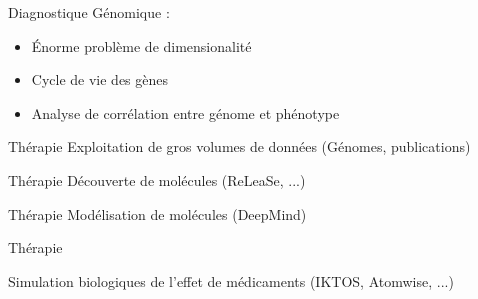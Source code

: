 \begin{frame}{Diagnostique}
  Génomique :
  \newline
  \begin{minipage}[c]{0.49\linewidth}
    \begin{itemize}
    \item Énorme problème de dimensionalité
    \item Cycle de vie des gènes
    \item Analyse de corrélation entre génome et phénotype
    \end{itemize}
  \end{minipage}\hfill
  \begin{minipage}[c]{0.49\linewidth}
  \end{minipage}\hfill
\end{frame}

\begin{frame}{Thérapie}
  Exploitation de gros volumes de données (Génomes, publications)
  \newline
  \newline
  \begin{minipage}[c]{0.49\linewidth}
  \end{minipage}\hfill
  \begin{minipage}[c]{0.49\linewidth}
  \end{minipage}\hfill
\end{frame}


\begin{frame}{Thérapie}
  Découverte de molécules (ReLeaSe, ...) 
\end{frame}

\begin{frame}{Thérapie}
  Modélisation de molécules (DeepMind)
\end{frame}

\begin{frame}{Thérapie}
  \begin{minipage}[c]{0.49\linewidth}
    Simulation biologiques de l'effet de médicaments (IKTOS, Atomwise, ...)
  \end{minipage}\hfill
  \begin{minipage}[c]{0.49\linewidth}
  \end{minipage}\hfill
\end{frame}

